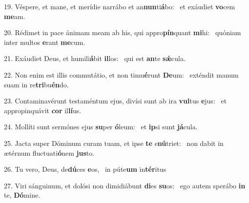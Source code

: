19. Véspere, et mane, et merídie narrábo et an\textbf{nun}ti\textbf{á}bo: \ast\  et exáudiet \textbf{vo}cem \textbf{me}am.\

20. Rédimet in pace ánimam meam ab his, qui appro\textbf{pín}quant \textbf{mi}hi: \ast\  quóniam inter multos \textbf{e}rant \textbf{me}cum.\

21. Exáudiet Deus, et humili\textbf{á}bit \textbf{il}los: \ast\  qui est \textbf{an}te \textbf{sǽ}cula.\

22. Non enim est illis commutátio, et non timu\textbf{é}runt \textbf{De}um: \ast\  exténdit manum suam in re\textbf{tri}bu\textbf{én}do.\

23. Contaminavérunt testaméntum ejus, divísi sunt ab ira \textbf{vul}tus \textbf{e}jus: \ast\  et appropinquávit \textbf{cor} il\textbf{lí}us.\

24. Mollíti sunt sermónes ejus \textbf{su}per \textbf{ó}leum: \ast\  et \textbf{ip}si sunt \textbf{já}cula.\

25. Jacta super Dóminum curam tuam, et ipse \textbf{te} e\textbf{nú}triet: \ast\  non dabit in ætérnum fluctuati\textbf{ó}nem \textbf{jus}to.\

26. Tu vero, Deus, de\textbf{dú}ces \textbf{e}os, \ast\  in púte\textbf{um} in\textbf{tér}itus\

27. Viri sánguinum, et dolósi non dimidiábunt \textbf{di}es \textbf{su}os: \ast\  ego autem sperábo \textbf{in} te, \textbf{Dó}mine.\

